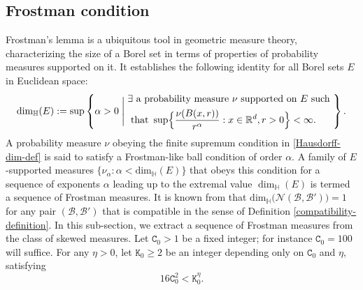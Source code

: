 \documentclass[12pt, twoside]{article}
\theoremstyle{definition}
\numberwithin{equation}{section}
\begin{document}
\subsection{Frostman condition} 
Frostman's lemma \cite[Chapter 8, p112]{Mattila-1} is a ubiquitous tool in geometric measure theory, characterizing the size of a Borel set in terms of properties of probability measures supported on it. It establishes the following identity for all Borel sets $E$ in Euclidean space: 
\begin{equation}  \text{dim}_{\mathbb H}(E) := \sup \left\{\alpha > 0 \; \Biggl| \; \begin{aligned} &\exists \text{ a probability measure $\nu$ supported on $E$ such } \\ &{\text{ that }} \sup \Bigl\{ \frac{\nu(B(x, r))}{r^{\alpha}} : x \in \mathbb R^d, r > 0 \Bigr\} < \infty. \end{aligned}  \right\}. \label{Hausdorff-dim-def}  \end{equation}    
A probability measure $\nu$ obeying the finite supremum condition in \eqref{Hausdorff-dim-def} is said to satisfy a Frostman-like ball condition of order $\alpha$. A family of $E$-supported measures $\{\nu_{\alpha} : \alpha < \text{dim}_{\mathbb H}(E) \}$ that obeys this condition for a sequence of exponents $\alpha$ leading up to the extremal value $\dim_{\mathbb H}(E)$ is termed a sequence of Frostman measures.  It is known from \cite{p81} that $\text{dim}_{\mathbb H}\bigl(\mathscr N(\mathscr{B}, \mathscr{B}')\bigr) = 1$ for any pair $(\mathscr{B}, \mathscr{B}')$ that is compatible in the sense of Definition \ref{compatibility-definition}. In this sub-section, we extract a sequence of Frostman measures from the class of skewed measures. 
\vskip0.1in 
\noindent Let $\mathtt C_0 > 1$ be a fixed integer; for instance $\mathtt C_0 = 100$ will suffice. For any $\eta > 0$,  let $\mathtt K_0 \geq 2$  be an integer depending only on $\mathtt C_0$ and $\eta$, satisfying
\begin{equation} \label{C0N0}
16\mathtt C_0^2 < \mathtt K_0^{\eta}. 
\end{equation} 
\end{document}
